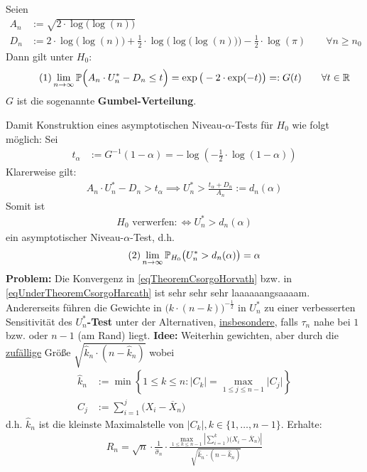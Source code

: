 \begin{thm}\label{theoremCH} %
	Seien
	\begin{align*}
		A_n&:=\sqrt{2\cdot\log\big(\log(n)\big)}\\
		D_n&:=2\cdot\log\big(\log(n)\big)+\frac{1}{2}\cdot\log\Big(\log\big(\log(n)\big)\Big)-\frac{1}{2}\cdot\log(\pi)\qquad\forall n\geq n_0
	\end{align*}
	Dann gilt unter $H_0$:
	\begin{align}\label{eqTheoremCsorgoHorvath}\tag{1}
		\lim\limits_{n\to\infty}\mathbb{P}\Big(A_n\cdot U_n^\ast-D_n\leq t\Big)=\exp\big(-2\cdot\exp(-t)\big)=:G(t)
		\qquad\forall t\in\mathbb{R}
	\end{align}
	$G$ ist die sogenannte \textbf{Gumbel-Verteilung}.
\end{thm}

Damit Konstruktion eines asymptotischen Niveau-$\alpha$-Tests für $H_0$ wie folgt möglich: Sei
\begin{align*}
t_\alpha&:=G^{-1}(1-\alpha)=-\log\left(-\frac{1}{2}\cdot\log(1-\alpha)\right)
\end{align*}
Klarerweise gilt:
\begin{align*}
A_n\cdot U_n^\ast-D_n>t_\alpha\implies U_n^\ast>\frac{t_\alpha+D_n}{A_n}:=d_n(\alpha)
\end{align*}
Somit ist 
\begin{align*}
H_0\text{ verwerfen}:\Longleftrightarrow U_n^\ast>d_n(\alpha)
\end{align*}
ein asymptotischer Niveau-$\alpha$-Test, d.h.
\begin{align}\label{eqUnderTheoremCsorgoHarcath}\tag{2}
\lim\limits_{n\to\infty}\mathbb{P}_{H_0}\big(U_n^\ast>d_n(\alpha)\big)=\alpha
\end{align}
\textbf{Problem:} Die Konvergenz in \eqref{eqTheoremCsorgoHorvath} bzw. in \eqref{eqUnderTheoremCsorgoHarcath} ist sehr sehr sehr laaaaaangsaaaam. %
Andererseits führen die Gewichte in $\big(k\cdot(n-k)\big)^{-\frac{1}{2}}$ in $U_n^\ast$ zu einer verbesserten Sensitivität des \textbf{$U_n^\ast$-Test} unter der Alternativen, \underline{insbesondere}, falls $\tau_n$ nahe bei $1$ bzw. oder $n-1$ (am Rand) liegt.\nl
\textbf{Idee:} Weiterhin gewichten, aber durch die \ul{zufällige} Größe $\sqrt{\hat{k}_n\cdot(n-\hat{k}_n)}$ wobei 
\begin{align*}
	\hat{k}_n&:=\min\left\lbrace 1\leq k\leq n:\big|C_k\big|=\max\limits_{1\leq j\leq n-1}\big|C_j\big|\right\rbrace\\
	C_j&:=\sum\limits_{i=1}^j \big(X_i-\overline{X}_n\big)
\end{align*}
d.h. $\hat{k}_n$ ist die kleinste Maximalstelle von $|C_k|,k\in\lbrace1,\ldots,n-1\rbrace$. Erhalte:
\begin{align*}
	R_n=\sqrt{n}\cdot\frac{1}{\hat{\sigma}_n}\cdot\frac{\max\limits_{1\leq k\leq n-1}\left|\sum\limits_{i=1}^k\big)(X_i-\overline{X}_n\big)\right|}{\sqrt{\hat{k}_n\cdot(n-\hat{k}_n)}}
\end{align*}

